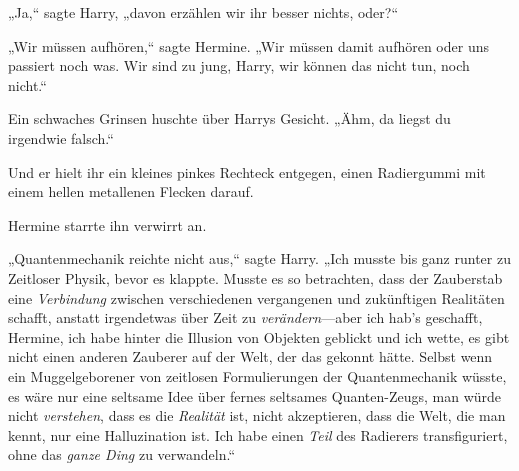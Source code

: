 „Ja,“ sagte Harry, „davon erzählen wir ihr besser nichts, oder?“

„Wir müssen aufhören,“ sagte Hermine. „Wir müssen damit aufhören oder uns passiert noch was. Wir sind zu jung, Harry, wir können das nicht tun, noch nicht.“

Ein schwaches Grinsen huschte über Harrys Gesicht. „Ähm, da liegst du irgendwie falsch.“

Und er hielt ihr ein kleines pinkes Rechteck entgegen, einen Radiergummi mit einem hellen metallenen Flecken darauf.

Hermine starrte ihn verwirrt an.

„Quantenmechanik reichte nicht aus,“ sagte Harry. „Ich musste bis ganz runter zu Zeitloser Physik, bevor es klappte. Musste es so betrachten, dass der Zauberstab eine \emph{Verbindung} zwischen verschiedenen vergangenen und zukünftigen Realitäten schafft, anstatt irgendetwas über Zeit zu \emph{verändern}—aber ich hab’s geschafft, Hermine, ich habe hinter die Illusion von Objekten geblickt und ich wette, es gibt nicht einen anderen Zauberer auf der Welt, der das gekonnt hätte. Selbst wenn ein Muggelgeborener von zeitlosen Formulierungen der Quantenmechanik wüsste, es wäre nur eine seltsame Idee über fernes seltsames Quanten-Zeugs, man würde nicht \emph{verstehen}, dass es die \emph{Realität} ist, nicht akzeptieren, dass die Welt, die man kennt, nur eine Halluzination ist. Ich habe einen \emph{Teil} des Radierers transfiguriert, ohne das \emph{ganze Ding} zu verwandeln.“

